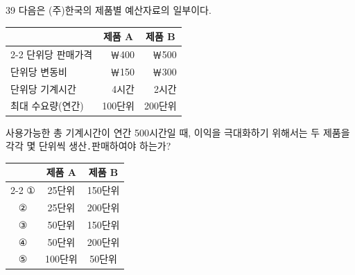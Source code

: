 \begin{question}{39}
다음은 (주)한국의 제품별 예산자료의 일부이다.

{\small\centering
\begin{tabular}{@{}l r r@{}}
\hline
 & \multicolumn{1}{c}{제품 A} & \multicolumn{1}{c}{제품 B} \\
\cline{2-2}\cline{3-3}
단위당 판매가격 & ￦400 & ￦500 \\
단위당 변동비 & ￦150 & ￦300 \\
단위당 기계시간 & 4시간 & 2시간 \\
최대 수요량(연간) & 100단위 & 200단위 \\
\hline
\end{tabular}\par}
사용가능한 총 기계시간이 연간 500시간일 때, 이익을 극대화하기 위해서는 두 제품을 각각 몇 단위씩 생산․판매하여야 하는가? \par

{\small\centering
\begin{tabular}{@{}ccc@{}}
 & 제품 A & 제품 B \\
\cline{2-2}\cline{3-3}
① & 25단위 & 150단위 \\
② & 25단위 & 200단위 \\
③ & 50단위 & 150단위 \\
④ & 50단위 & 200단위 \\
⑤ & 100단위 & 50단위 \\
\end{tabular}\par}
\end{question}
